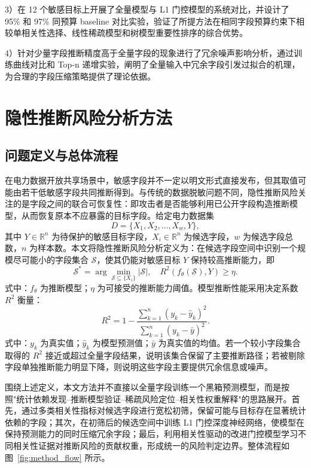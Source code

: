 \documentclass[UTF8,zihao=5,twoside]{ctexart}
\numberwithin{equation}{section}
\begin{document}
3）在 12 个敏感目标上开展了全量模型与 L1 门控模型的系统对比，并设计了 95\% 和 97\% 同预算 baseline 对比实验，验证了所提方法在相同字段预算约束下相较单相关性选择、线性稀疏模型和树模型重要性排序的综合优势。

4）针对少量字段推断精度高于全量字段的现象进行了冗余噪声影响分析，通过训练曲线对比和 Top-n 递增实验，阐明了全量输入中冗余字段引发过拟合的机理，为合理的字段压缩策略提供了理论依据。

\section{隐性推断风险分析方法}
\subsection{问题定义与总体流程}
在电力数据开放共享场景中，敏感字段并不一定以明文形式直接发布，但其取值可能由若干低敏感字段共同推断得到。与传统的数据脱敏问题不同，隐性推断风险关注的是字段之间的联合可恢复性：即攻击者是否能够利用已公开字段构造推断模型，从而恢复原本不应暴露的目标字段。给定电力数据集
\begin{equation}
D=\{X_1,X_2,\ldots,X_w,Y\},
\end{equation}
其中 $Y\in\mathbb{R}^{n}$ 为待保护的敏感目标字段，$X_i\in\mathbb{R}^{n}$ 为候选字段，$w$ 为候选字段总数，$n$ 为样本数。本文将隐性推断风险分析定义为：在候选字段空间中识别一个规模尽可能小的字段集合 $\mathcal{S}$，使其仍能对敏感目标 $Y$ 保持较高推断能力，即
\begin{equation}
\mathcal{S}^{*}=\arg\min_{\mathcal{S}\subseteq \{X_i\}}\left|\mathcal{S}\right|,
\quad
R^2(f_{\theta}(\mathcal{S}),Y)\geq \eta .
\end{equation}
式中：$f_{\theta}$ 为推断模型；$\eta$ 为可接受的推断能力阈值。模型推断性能采用决定系数 $R^2$ 衡量：
\begin{equation}
R^2=1-\frac{\sum_{k=1}^{n}(y_k-\hat{y}_k)^2}{\sum_{k=1}^{n}(y_k-\bar{y})^2}.
\end{equation}
式中：$y_k$ 为真实值；$\hat{y}_k$ 为模型预测值；$\bar{y}$ 为真实值的均值。若一个较小字段集合取得的 $R^2$ 接近或超过全量字段结果，说明该集合保留了主要推断路径；若被剔除字段单独推断能力明显下降，则说明这些字段主要提供冗余信息或噪声。

围绕上述定义，本文方法并不直接以全量字段训练一个黑箱预测模型，而是按照"统计依赖发现--推断模型验证--稀疏风险定位--相关性权重解释"的思路展开。首先，通过多类相关性指标对候选字段进行宽松初筛，保留可能与目标存在显著统计依赖的字段；其次，在初筛后的候选空间中训练 L1 门控深度神经网络，使模型在保持预测能力的同时压缩冗余字段；最后，利用相关性驱动的改进门控模型学习不同相关性证据对推断风险的贡献权重，形成统一的风险判定边界。整体流程如图~\ref{fig:method_flow} 所示。
\end{document}
